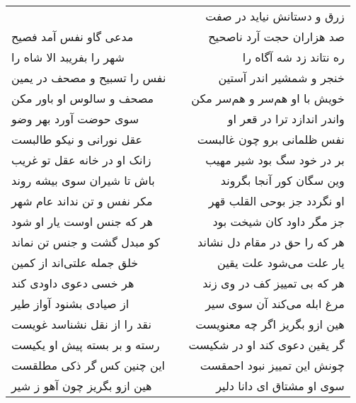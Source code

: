 \begin{center}
\begin{longtable}{l p{0.5cm} r}
&&
زرق و دستانش نیاید در صفت
\\
مدعی گاو نفس آمد فصیح
&&
صد هزاران حجت آرد ناصحیح
\\
شهر را بفریبد الا شاه را
&&
ره نتاند زد شه آگاه را
\\
نفس را تسبیح و مصحف در یمین
&&
خنجر و شمشیر اندر آستین
\\
مصحف و سالوس او باور مکن
&&
خویش با او هم‌سر و هم‌سر مکن
\\
سوی حوضت آورد بهر وضو
&&
واندر اندازد ترا در قعر او
\\
عقل نورانی و نیکو طالبست
&&
نفس ظلمانی برو چون غالبست
\\
زانک او در خانه عقل تو غریب
&&
بر در خود سگ بود شیر مهیب
\\
باش تا شیران سوی بیشه روند
&&
وین سگان کور آنجا بگروند
\\
مکر نفس و تن نداند عام شهر
&&
او نگردد جز بوحی القلب قهر
\\
هر که جنس اوست یار او شود
&&
جز مگر داود کان شیخت بود
\\
کو مبدل گشت و جنس تن نماند
&&
هر که را حق در مقام دل نشاند
\\
خلق جمله علتی‌اند از کمین
&&
یار علت می‌شود علت یقین
\\
هر خسی دعوی داودی کند
&&
هر که بی تمییز کف در وی زند
\\
از صیادی بشنود آواز طیر
&&
مرغ ابله می‌کند آن سوی سیر
\\
نقد را از نقل نشناسد غویست
&&
هین ازو بگریز اگر چه معنویست
\\
رسته و بر بسته پیش او یکیست
&&
گر یقین دعوی کند او در شکیست
\\
این چنین کس گر ذکی مطلقست
&&
چونش این تمییز نبود احمقست
\\
هین ازو بگریز چون آهو ز شیر
&&
سوی او مشتاق ای دانا دلیر
\\
\end{longtable}
\end{center}
